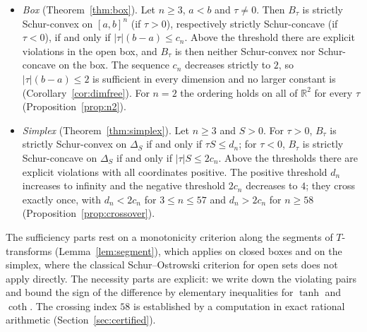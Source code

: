\documentclass[11pt,a4paper]{article}
\theoremstyle{plain}
\theoremstyle{definition}
\newcommand{\R}{\mathbb{R}}
\newcommand{\Simp}{\Delta}
\begin{document}
\begin{itemize}
\item \emph{Box} (Theorem~\ref{thm:box}). Let $n\ge 3$, $a<b$ and $\tau\neq 0$. Then $B_\tau$ is strictly Schur-convex on $[a,b]^n$ (if $\tau>0$), respectively strictly Schur-concave (if $\tau<0$), if and only if $|\tau|(b-a)\le c_n$. Above the threshold there are explicit violations in the open box, and $B_\tau$ is then neither Schur-convex nor Schur-concave on the box. The sequence $c_n$ decreases strictly to $2$, so $|\tau|(b-a)\le 2$ is sufficient in every dimension and no larger constant is (Corollary~\ref{cor:dimfree}). For $n=2$ the ordering holds on all of $\R^2$ for every $\tau$ (Proposition~\ref{prop:n2}).
\item \emph{Simplex} (Theorem~\ref{thm:simplex}). Let $n\ge 3$ and $S>0$. For $\tau>0$, $B_\tau$ is strictly Schur-convex on $\Simp_S$ if and only if $\tau S\le d_n$; for $\tau<0$, $B_\tau$ is strictly Schur-concave on $\Simp_S$ if and only if $|\tau|S\le 2c_n$. Above the thresholds there are explicit violations with all coordinates positive. The positive threshold $d_n$ increases to infinity and the negative threshold $2c_n$ decreases to $4$; they cross exactly once, with $d_n<2c_n$ for $3\le n\le 57$ and $d_n>2c_n$ for $n\ge 58$ (Proposition~\ref{prop:crossover}).
\end{itemize}

The sufficiency parts rest on a monotonicity criterion along the segments of $T$-transforms (Lemma~\ref{lem:segment}), which applies on closed boxes and on the simplex, where the classical Schur--Ostrowski criterion for open sets does not apply directly. The necessity parts are explicit: we write down the violating pairs and bound the sign of the difference by elementary inequalities for $\tanh$ and $\coth$. The crossing index $58$ is established by a computation in exact rational arithmetic (Section~\ref{sec:certified}).
\end{document}

